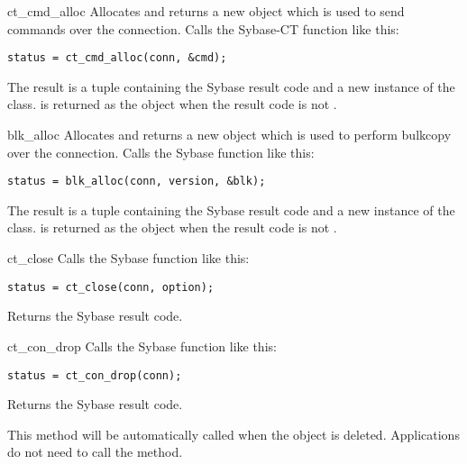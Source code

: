 \begin{methoddesc}[CS_CONNECTION]{ct_cmd_alloc}{}
Allocates and returns a new  object which is used to
send commands over the connection.  Calls the Sybase-CT
 function like this:

\begin{verbatim}
status = ct_cmd_alloc(conn, &cmd);
\end{verbatim}

The result is a tuple containing the Sybase result code and a new
instance of the  class.  is returned as
the  object when the result code is not
.
\end{methoddesc}

\begin{methoddesc}[CS_CONNECTION]{blk_alloc}{}
Allocates and returns a new  object which is used to
perform bulkcopy over the connection.  Calls the Sybase
 function like this:

\begin{verbatim}
status = blk_alloc(conn, version, &blk);
\end{verbatim}

The result is a tuple containing the Sybase result code and a new
instance of the  class.  is returned as
the  object when the result code is not
.
\end{methoddesc}

\begin{methoddesc}[CS_CONNECTION]{ct_close}{}
Calls the Sybase  function like this:

\begin{verbatim}
status = ct_close(conn, option);
\end{verbatim}

Returns the Sybase result code.
\end{methoddesc}

\begin{methoddesc}[CS_CONNECTION]{ct_con_drop}{}
Calls the Sybase  function like this:

\begin{verbatim}
status = ct_con_drop(conn);
\end{verbatim}

Returns the Sybase result code.

This method will be automatically called when the 
object is deleted.  Applications do not need to call the method.
\end{methoddesc}

